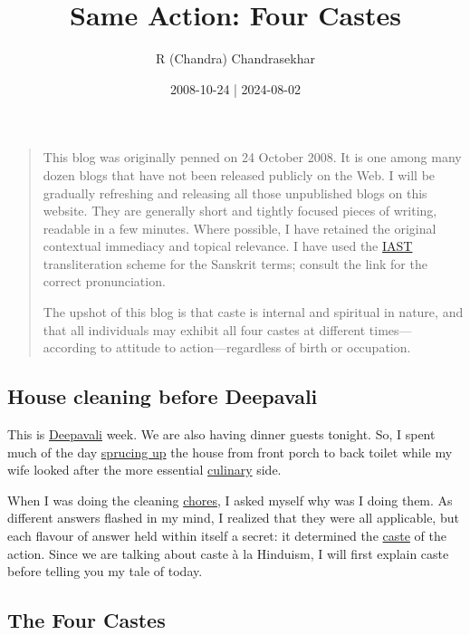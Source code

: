 \documentclass[
  a4paper,
]{article}
\title{Same Action: Four Castes}
\author{R (Chandra) Chandrasekhar}
\date{2008-10-24 | 2024-08-02}
\begin{document}
\maketitle

\thispagestyle{empty}


\begin{quote}
This blog was originally penned on 24 October 2008. It is one among many
dozen blogs that have not been released publicly on the Web. I will be
gradually refreshing and releasing all those unpublished blogs on this
website. They are generally short and tightly focused pieces of writing,
readable in a few minutes. Where possible, I have retained the original
contextual immediacy and topical relevance. I have used the
\href{https://en.wikipedia.org/wiki/International_Alphabet_of_Sanskrit_Transliteration}{IAST}
transliteration scheme for the Sanskrit terms; consult the link for the
correct pronunciation.

The upshot of this blog is that caste is internal and spiritual in
nature, and that all individuals may exhibit all four castes at
different times---according to attitude to action---regardless of birth
or occupation.
\end{quote}

\subsection{House cleaning before
Deepavali}\label{house-cleaning-before-deepavali}

This is \href{https://en.wikipedia.org/wiki/Diwali}{Deepavali} week. We
are also having dinner guests tonight. So, I spent much of the day
\href{https://dictionary.cambridge.org/dictionary/english/spruce-up}{sprucing
up} the house from front porch to back toilet while my wife looked after
the more essential
\href{https://www.thefreedictionary.com/culinary}{culinary} side.

When I was doing the cleaning
\href{https://www.oxfordlearnersdictionaries.com/definition/english/chore}{chores},
I asked myself why was I doing them. As different answers flashed in my
mind, I realized that they were all applicable, but each flavour of
answer held within itself a secret: it determined the
\href{https://www.thefreedictionary.com/caste}{caste} of the action.
Since we are talking about caste à la Hinduism, I will first explain
caste before telling you my tale of today.

\subsection{The Four Castes}\label{the-four-castes}
\end{document}

